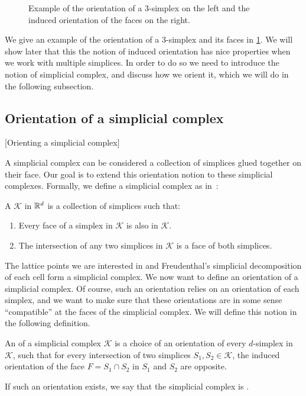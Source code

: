 \begin{figure}[ht]
	\centering
	\caption[Orientation of a simplex]{Example of the orientation of a 3-simplex on the left and the induced orientation of the faces on the right.}\label{fig:orientation_of_simplex}
\end{figure}

We give an example of the orientation of a 3-simplex and its faces in \cref{fig:orientation_of_simplex}. We will show later that this the notion of induced orientation has nice properties when we work with multiple simplices. In order to do so we need to introduce the notion of simplicial complex, and discuss how we orient it, which we will do in the following subsection.

\subsection{Orientation of a simplicial complex}[Orienting a simplicial complex]

A simplicial complex can be considered a collection of simplices glued together on their face. Our goal is to extend this orientation notion to these simplicial complexes. Formally, we define a simplicial complex as in~:

\begin{definition}
	A  $\mathcal{K}$ in $\mathbb{R}^d$ is a collection of simplices such that:
	\begin{enumerate}
		\item Every face of a simplex in $\mathcal{K}$ is also in $\mathcal{K}$.
		\item The intersection of any two simplices in $\mathcal{K}$ is a face of both simplices.
	\end{enumerate}
\end{definition}

The lattice points we are interested in and Freudenthal's simplicial decomposition of each cell form a simplicial complex. We now want to define an orientation of a simplicial complex. Of course, such an orientation relies on an orientation of each simplex, and we want to make sure that these orientations are in some sense ``compatible'' at the faces of the simplicial complex. We will define this notion in the following definition.

\begin{definition}
	An  of a simplicial complex $\mathcal{K}$ is a choice of an orientation of every $d$-simplex in $\mathcal{K}$, such that for every intersection of two simplices $S_1, S_2 \in \mathcal{K}$, the induced orientation of the face $F = S_1 \cap S_2$ in $S_1$ and $S_2$ are opposite. \par
	If such an orientation exists, we say that the simplicial complex is .
\end{definition}

